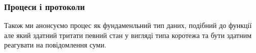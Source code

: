 \documentclass[11pt,oneside]{article}
\begin{document}
\begingroup
\parbox[t][][l]{0.40\textwidth}{

\begin{prooftree}
\end{prooftree}

\begin{prooftree}
\end{prooftree}

}
\hspace{0.1cm}
\parbox[t][][r]{0.60\textwidth}{


\begin{prooftree}
\end{prooftree}

\begin{prooftree}
\end{prooftree}


}
\endgroup


  \subsubsection*{Процеси і протоколи}

Також ми анонсуємо процес як фундаменльний тип даних, подібний до функції але який здатний
тритати певний стан у вигляді типа коротежа та бути здатним реагувати на повідомлення суми.

\begin{prooftree}
\end{prooftree}

\begin{prooftree}
\end{prooftree}

\begin{prooftree}
\end{prooftree}
\end{document}
